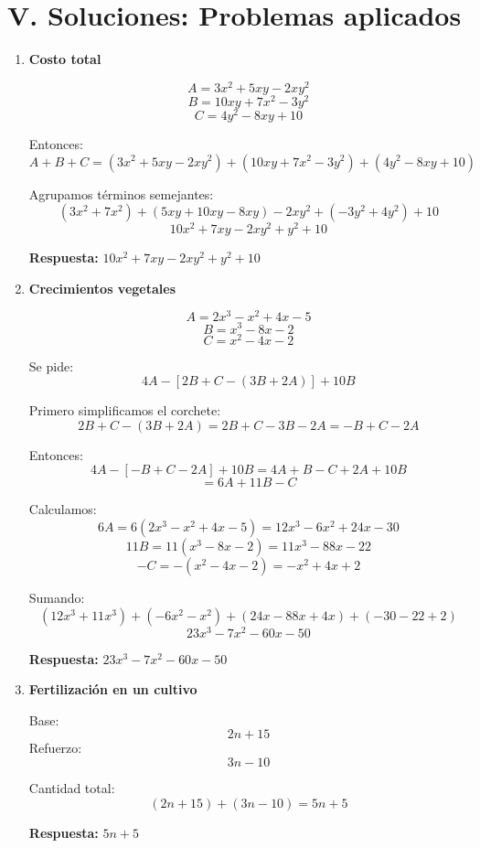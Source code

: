 \documentclass[12pt]{article}
\begin{document}
	\newpage
	
	\section*{V. Soluciones: Problemas aplicados}
	
	\begin{enumerate}[itemsep=0.9cm]
		
		\item \textbf{Costo total}
		
		\[
		A = 3x^2 + 5xy - 2xy^2
		\]
		\[
		B = 10xy + 7x^2 - 3y^2
		\]
		\[
		C = 4y^2 - 8xy + 10
		\]
		
		Entonces:
		\[
		A+B+C=(3x^2 + 5xy - 2xy^2)+(10xy + 7x^2 - 3y^2)+(4y^2 - 8xy + 10)
		\]
		
		Agrupamos términos semejantes:
		\[
		(3x^2+7x^2)+(5xy+10xy-8xy)-2xy^2+(-3y^2+4y^2)+10
		\]
		\[
		10x^2 + 7xy - 2xy^2 + y^2 + 10
		\]
		
		\textbf{Respuesta:} \(\boxed{10x^2 + 7xy - 2xy^2 + y^2 + 10}\)
		
		\item \textbf{Crecimientos vegetales}
		
		\[
		A = 2x^3 - x^2 + 4x - 5
		\]
		\[
		B = x^3 - 8x - 2
		\]
		\[
		C = x^2 - 4x - 2
		\]
		
		Se pide:
		\[
		4A - [2B + C - (3B + 2A)] +10B
		\]
		
		Primero simplificamos el corchete:
		\[
		2B + C - (3B + 2A)=2B+C-3B-2A = -B + C - 2A
		\]
		
		Entonces:
		\[
		4A -[-B + C -2A] + 10B = 4A + B - C + 2A + 10B
		\]
		\[
		=6A + 11B - C
		\]
		
		Calculamos:
		\[
		6A = 6(2x^3 - x^2 + 4x - 5)=12x^3 - 6x^2 + 24x - 30
		\]
		\[
		11B = 11(x^3 - 8x -2)=11x^3 - 88x - 22
		\]
		\[
		-C = -(x^2 - 4x -2)= -x^2 + 4x + 2
		\]
		
		Sumando:
		\[
		(12x^3+11x^3)+(-6x^2-x^2)+(24x-88x+4x)+(-30-22+2)
		\]
		\[
		23x^3 - 7x^2 - 60x - 50
		\]
		
		\textbf{Respuesta:} \(\boxed{23x^3 - 7x^2 - 60x - 50}\)
		
		\item \textbf{Fertilización en un cultivo}
		
		Base:
		\[
		2n+15
		\]
		Refuerzo:
		\[
		3n-10
		\]
		
		Cantidad total:
		\[
		(2n+15)+(3n-10)=5n+5
		\]
		
		\textbf{Respuesta:} \(\boxed{5n+5}\)
		

\end{enumerate}
\end{document}

